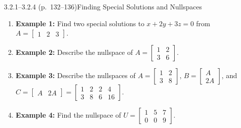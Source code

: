 \documentclass[11pt,a4paper,openany,oneside]{book}
\numberwithin{equation}{chapter}
\begin{document}
\begin{example}{3.2.1--3.2.4 (p.\ 132--136)}{Finding Special Solutions and Nullspaces}
\begin{enumerate}
\item \textbf{Example 1:} Find two special solutions to $x + 2y + 3z = 0$ from $A = \begin{bmatrix}1 & 2 & 3\end{bmatrix}$.
\item \textbf{Example 2:} Describe the nullspace of $A = \begin{bmatrix}1 & 2\\3 & 6\end{bmatrix}$.
\item \textbf{Example 3:} Describe the nullspaces of $A = \begin{bmatrix}1 & 2\\3 & 8\end{bmatrix}$, $B = \begin{bmatrix}A\\2A\end{bmatrix}$, and $C = \begin{bmatrix}A & 2A\end{bmatrix} = \begin{bmatrix}1 & 2 & 2 & 4\\3 & 8 & 6 & 16\end{bmatrix}$.
\item \textbf{Example 4:} Find the nullspace of $U = \begin{bmatrix}1 & 5 & 7\\0 & 0 & 9\end{bmatrix}$.
\end{enumerate}
\end{example}
\end{document}
